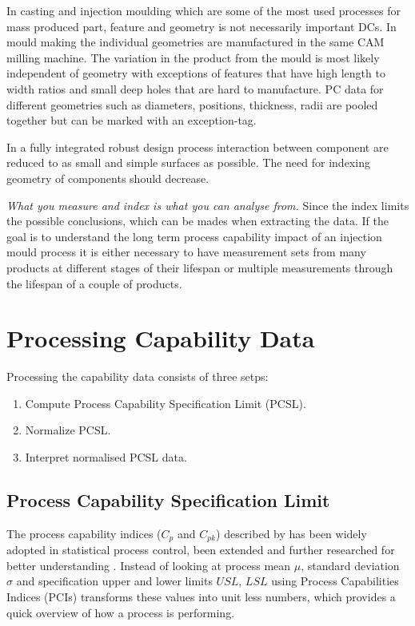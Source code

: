 \documentclass[aip,amsmath, reprint, author-year]{revtex4-1}
\begin{document}
In casting and injection moulding which are some of the most used processes for mass produced part, feature and geometry is not necessarily important DCs. In mould making the individual geometries are manufactured in the same CAM milling machine. 
The variation in the product from the mould is most likely independent of geometry with exceptions of features that have high length to width ratios and small deep holes that are hard to manufacture. PC data for different geometries such as diameters, positions, thickness, radii are pooled together but can be marked with an exception-tag.

In a fully integrated robust design process interaction between component are reduced to as small and simple surfaces as possible. The need for indexing geometry of components should decrease.

\emph{What you measure and index is what you can analyse from.}
Since the index limits the possible conclusions, which can be mades when extracting the data. If the goal is to understand the long term process capability impact of an injection mould process it is either necessary to have measurement sets from many products at different stages of their lifespan or multiple measurements through the lifespan of a couple of products.    

\section{Processing Capability Data}

Processing the capability data consists of three setps: 

\begin{enumerate}
	\item Compute Process Capability Specification Limit (PCSL).
	\item Normalize PCSL.
	\item Interpret normalised PCSL data.
\end{enumerate}

\subsection{Process Capability Specification Limit}
The process capability indices ($C_p$ and $C_{pk}$) described by \cite{kane1986process} has been widely adopted in statistical process control, been extended and further researched for better understanding \citep{wu2009overview}. 
Instead of looking at process mean $\mu$, standard deviation $\sigma$ and specification upper and lower limits $USL$, $LSL$ using Process Capabilities Indices (PCIs) transforms these values into unit less numbers, which provides a quick overview of how a process is performing.
\end{document}
